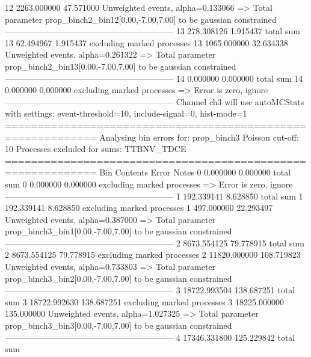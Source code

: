 12         2263.000000     47.571000       Unweighted events, alpha=0.133066
  => Total parameter prop_binch2_bin12[0.00,-7.00,7.00] to be gaussian constrained
------------------------------------------------------------
13         278.308126      1.915437        total sum                     
13         62.494967       1.915437        excluding marked processes    
13         1065.000000     32.634338       Unweighted events, alpha=0.261322
  => Total parameter prop_binch2_bin13[0.00,-7.00,7.00] to be gaussian constrained
------------------------------------------------------------
14         0.000000        0.000000        total sum                     
14         0.000000        0.000000        excluding marked processes    
  => Error is zero, ignore      
------------------------------------------------------------
Channel ch3 will use autoMCStats with settings: event-threshold=10, include-signal=0, hist-mode=1
============================================================
Analysing bin errors for: prop_binch3
Poisson cut-off: 10
Processes excluded for sums: TTBNV_TDCE
============================================================
Bin        Contents        Error           Notes                         
0          0.000000        0.000000        total sum                     
0          0.000000        0.000000        excluding marked processes    
  => Error is zero, ignore      
------------------------------------------------------------
1          192.339141      8.628850        total sum                     
1          192.339141      8.628850        excluding marked processes    
1          497.000000      22.293497       Unweighted events, alpha=0.387000
  => Total parameter prop_binch3_bin1[0.00,-7.00,7.00] to be gaussian constrained
------------------------------------------------------------
2          8673.554125     79.778915       total sum                     
2          8673.554125     79.778915       excluding marked processes    
2          11820.000000    108.719823      Unweighted events, alpha=0.733803
  => Total parameter prop_binch3_bin2[0.00,-7.00,7.00] to be gaussian constrained
------------------------------------------------------------
3          18722.993504    138.687251      total sum                     
3          18722.992630    138.687251      excluding marked processes    
3          18225.000000    135.000000      Unweighted events, alpha=1.027325
  => Total parameter prop_binch3_bin3[0.00,-7.00,7.00] to be gaussian constrained
------------------------------------------------------------
4          17346.331800    125.229842      total sum                     

